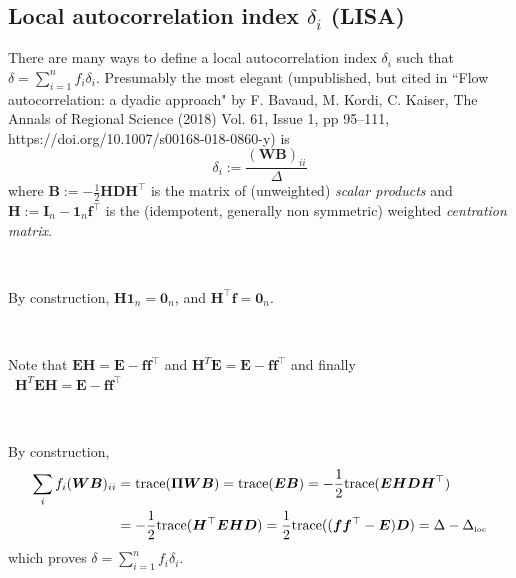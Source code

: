 \documentclass[11pt]{article}
\begin{document}
 \subsection{Local autocorrelation index $\delta_i$ (LISA)}
 There are many ways to define a local autocorrelation index $\delta_i$ such that $\delta=\sum_{i=1}^n f_i \delta_i$.  Presumably the most elegant (unpublished, but cited in ``Flow autocorrelation: a dyadic approach" by 
F. Bavaud, M. Kordi, C. Kaiser, The Annals of Regional Science (2018) Vol. 61, Issue 1, pp 95--111, https://doi.org/10.1007/s00168-018-0860-y) is 
\begin{equation}
\label{ }
\delta_i:=\frac{(\bm{W}\bm{B})_{ii}}{\Delta}
\end{equation}
where $\bm{B}:=-\frac12 \bm{H}\bm{D}\bm{H}^\top$ is the matrix of (unweighted) {\em scalar products} and $\bm{H}:=\bm{I}_n-\bm{1}_n\bm{f}^\top$ is the (idempotent, generally non symmetric) weighted {\em centration matrix}. 

\

By construction, $\bm{H}\bm{1}_n=\bm{0}_n$, and $\bm{H}^\top\bm{f}=\bm{0}_n$.

\

Note that $\bm{E}\bm{H}=\bm{E}-\bm{f}\bm{f}^\top$ and $\bm{H}^T\bm{E}=\bm{E}-\bm{f}\bm{f}^\top$ and finally \\ $\bm{H}^T\bm{E}\bm{H}=\bm{E}-\bm{f}\bm{f}^\top$ 

\

By construction, 
\begin{align*} 
\sum_i f_i (\bm{W}\bm{B})_{ii} & = \mbox{trace}(\bm{\Pi}\bm{W}\bm{B})=\mbox{trace}(\bm{E}\bm{B})=-\frac12\mbox{trace}(\bm{E}\bm{H}\bm{D}\bm{H}^\top) \\ 
  & =-\frac12\mbox{trace}(\bm{H}^\top\bm{E}\bm{H}\bm{D})=\frac12\mbox{trace}((\bm{f}\bm{f}^\top-\bm{E})\bm{D})=\Delta- \Delta_{\mbox{\tiny loc}}
\end{align*}
which proves  $\delta=\sum_{i=1}^n f_i \delta_i$. 
 
 
 
 
\end{document}
